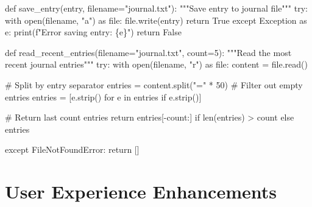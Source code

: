 \documentclass[
  letterpaper,
  DIV=11,
  numbers=noendperiod,
  oneside]{scrreprt}
\newenvironment{Shaded}{}{}
\newcommand{\BuiltInTok}[1]{\textcolor[rgb]{0.84,0.23,0.29}{#1}}
\newcommand{\CommentTok}[1]{\textcolor[rgb]{0.42,0.45,0.49}{#1}}
\newcommand{\ControlFlowTok}[1]{\textcolor[rgb]{0.84,0.23,0.29}{#1}}
\newcommand{\DecValTok}[1]{\textcolor[rgb]{0.00,0.36,0.77}{#1}}
\newcommand{\ImportTok}[1]{\textcolor[rgb]{0.01,0.18,0.38}{#1}}
\newcommand{\KeywordTok}[1]{\textcolor[rgb]{0.84,0.23,0.29}{#1}}
\newcommand{\NormalTok}[1]{\textcolor[rgb]{0.14,0.16,0.18}{#1}}
\newcommand{\OperatorTok}[1]{\textcolor[rgb]{0.14,0.16,0.18}{#1}}
\newcommand{\PreprocessorTok}[1]{\textcolor[rgb]{0.84,0.23,0.29}{#1}}
\newcommand{\SpecialCharTok}[1]{\textcolor[rgb]{0.00,0.36,0.77}{#1}}
\newcommand{\SpecialStringTok}[1]{\textcolor[rgb]{0.01,0.18,0.38}{#1}}
\newcommand{\StringTok}[1]{\textcolor[rgb]{0.01,0.18,0.38}{#1}}
\newcommand{\VariableTok}[1]{\textcolor[rgb]{0.89,0.38,0.04}{#1}}
\begin{document}
\begin{Shaded}
\begin{Highlighting}[]
\KeywordTok{def}\NormalTok{ save\_entry(entry, filename}\OperatorTok{=}\StringTok{"journal.txt"}\NormalTok{):}
    \CommentTok{"""Save entry to journal file"""}
    \ControlFlowTok{try}\NormalTok{:}
        \ControlFlowTok{with} \BuiltInTok{open}\NormalTok{(filename, }\StringTok{"a"}\NormalTok{) }\ImportTok{as} \BuiltInTok{file}\NormalTok{:}
            \BuiltInTok{file}\NormalTok{.write(entry)}
        \ControlFlowTok{return} \VariableTok{True}
    \ControlFlowTok{except} \PreprocessorTok{Exception} \ImportTok{as}\NormalTok{ e:}
        \BuiltInTok{print}\NormalTok{(}\SpecialStringTok{f"Error saving entry: }\SpecialCharTok{\{}\NormalTok{e}\SpecialCharTok{\}}\SpecialStringTok{"}\NormalTok{)}
        \ControlFlowTok{return} \VariableTok{False}

\KeywordTok{def}\NormalTok{ read\_recent\_entries(filename}\OperatorTok{=}\StringTok{"journal.txt"}\NormalTok{, count}\OperatorTok{=}\DecValTok{5}\NormalTok{):}
    \CommentTok{"""Read the most recent journal entries"""}
    \ControlFlowTok{try}\NormalTok{:}
        \ControlFlowTok{with} \BuiltInTok{open}\NormalTok{(filename, }\StringTok{"r"}\NormalTok{) }\ImportTok{as} \BuiltInTok{file}\NormalTok{:}
\NormalTok{            content }\OperatorTok{=} \BuiltInTok{file}\NormalTok{.read()}
            
        \CommentTok{\# Split by entry separator}
\NormalTok{        entries }\OperatorTok{=}\NormalTok{ content.split(}\StringTok{"="} \OperatorTok{*} \DecValTok{50}\NormalTok{)}
        \CommentTok{\# Filter out empty entries}
\NormalTok{        entries }\OperatorTok{=}\NormalTok{ [e.strip() }\ControlFlowTok{for}\NormalTok{ e }\KeywordTok{in}\NormalTok{ entries }\ControlFlowTok{if}\NormalTok{ e.strip()]}
        
        \CommentTok{\# Return last \textquotesingle{}count\textquotesingle{} entries}
        \ControlFlowTok{return}\NormalTok{ entries[}\OperatorTok{{-}}\NormalTok{count:] }\ControlFlowTok{if} \BuiltInTok{len}\NormalTok{(entries) }\OperatorTok{\textgreater{}}\NormalTok{ count }\ControlFlowTok{else}\NormalTok{ entries}
        
    \ControlFlowTok{except} \PreprocessorTok{FileNotFoundError}\NormalTok{:}
        \ControlFlowTok{return}\NormalTok{ []}
\end{Highlighting}
\end{Shaded}

\section{User Experience
Enhancements}\label{user-experience-enhancements}
\end{document}
